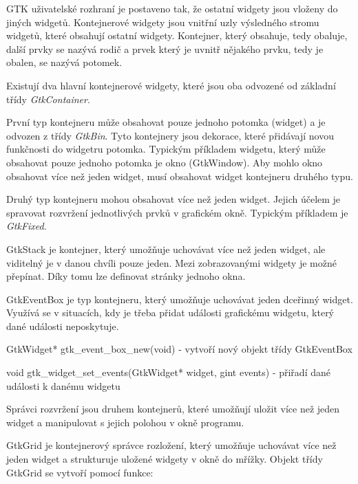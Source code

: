 
GTK uživatelské rozhraní je postaveno tak, že ostatní widgety jsou vloženy do jiných widgetů. Kontejnerové widgety jsou vnitřní uzly výsledného stromu widgetů, které obsahují ostatní widgety. Kontejner, který obsahuje, tedy obaluje, další prvky se nazývá rodič a prvek který je uvnitř nějakého prvku, tedy je obalen, se nazývá potomek.

Existují dva hlavní kontejnerové widgety, které jsou oba odvozené od základní třídy {\it GtkContainer}.

První typ kontejneru může obsahovat pouze jednoho potomka (widget) a je odvozen z třídy {\it GtkBin}. Tyto kontejnery jsou dekorace, které přidávají novou funkčnosti do widgetru potomka. Typickým příkladem widgetu, který může obsahovat pouze jednoho potomka je okno (GtkWindow). Aby mohlo okno obsahovat více než jeden widget, musí obsahovat widget kontejneru druhého typu.

Druhý typ kontejneru mohou obsahovat více než jeden widget. Jejich účelem je spravovat rozvržení jednotlivých prvků v grafickém okně. Typickým příkladem je {\it GtkFixed}.


GtkStack je kontejner, který umožňuje uchovávat více než jeden widget, ale viditelný je v danou chvíli pouze jeden. Mezi zobrazovanými widgety je možné přepínat. Díky tomu lze definovat stránky jednoho okna. 


GtkEventBox je typ kontejneru, který umožňuje uchovávat jeden dceřinný widget. Využívá se v situacích, kdy je třeba přidat události grafickému widgetu, který dané události neposkytuje.

\vskip 4mm
{\verbatim GtkWidget* gtk\_event\_box\_new(void)} - vytvoří nový objekt třídy GtkEventBox
\vskip 4mm

\vskip 4mm
{\verbatim void gtk\_widget\_set\_events(GtkWidget* widget, gint events)} - přiřadí dané události k danému widgetu
\vskip 4mm




Správci rozvržení jsou druhem kontejnerů, které umožňují uložit více než jeden widget a manipulovat s jejich polohou v okně programu.


GtkGrid je kontejnerový správce rozložení, který umožňuje uchovávat více než jeden widget a strukturuje uložené widgety v okně do mřížky. Objekt třídy GtkGrid se vytvoří pomocí funkce:

